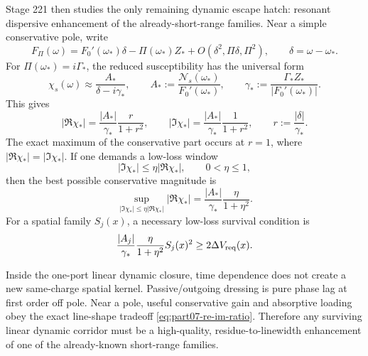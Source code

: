 Stage 221 then studies the only remaining dynamic escape hatch: resonant dispersive enhancement of the already-short-range families.  Near a simple conservative pole, write
\begin{equation}
\label{eq:part07-simple-pole-denominator}
F_\Pi(\omega)=F_0'(\omega_*)\delta-\Pi(\omega_*)Z_*+O(\delta^2,\Pi\delta,\Pi^2),
\qquad
\delta=\omega-\omega_*.
\end{equation}
For \(\Pi(\omega_*)=i\Gamma_*\), the reduced susceptibility has the universal form
\begin{equation}
\label{eq:part07-breit-wigner}
\chi_s(\omega)\approx\frac{A_*}{\delta-i\gamma_*},
\qquad
A_*:=\frac{\mathcal N_s(\omega_*)}{F_0'(\omega_*)},
\qquad
\gamma_*:=\frac{\Gamma_*Z_*}{|F_0'(\omega_*)|}.
\end{equation}
This gives
\begin{equation}
\label{eq:part07-re-im-ratio}
|\Re\chi_*|=\frac{|A_*|}{\gamma_*}\frac{r}{1+r^2},
\qquad
|\Im\chi_*|=\frac{|A_*|}{\gamma_*}\frac1{1+r^2},
\qquad
r:=\frac{|\delta|}{\gamma_*}.
\end{equation}
The exact maximum of the conservative part occurs at \(r=1\), where \(|\Re\chi_*|=|\Im\chi_*|\).  If one demands a low-loss window
\begin{equation}
\label{eq:part07-low-loss-window}
|\Im\chi_*|\le\eta|\Re\chi_*|,
\qquad
0<\eta\le1,
\end{equation}
then the best possible conservative magnitude is
\begin{equation}
\label{eq:part07-low-loss-bound}
\sup_{|\Im\chi_*|\le\eta|\Re\chi_*|}|\Re\chi_*|
=
\frac{|A_*|}{\gamma_*}\frac{\eta}{1+\eta^2}.
\end{equation}
For a spatial family \(S_j(x)\), a necessary low-loss survival condition is
\begin{equation}
\label{eq:part07-linear-survival-window}
\frac{|A_j|}{\gamma_*}\frac{\eta}{1+\eta^2}S_j(x)^2
\ge
2\Delta V_{\rm req}(x).
\end{equation}

\begin{theorem}
\label{thm:part07-dynamic-no-free-lunch}
Inside the one-port linear dynamic closure, time dependence does not create a new same-charge spatial kernel.  Passive/outgoing dressing is pure phase lag at first order off pole.  Near a pole, useful conservative gain and absorptive loading obey the exact line-shape tradeoff \cref{eq:part07-re-im-ratio}.  Therefore any surviving linear dynamic corridor must be a high-quality, residue-to-linewidth enhancement of one of the already-known short-range families.
\end{theorem}


